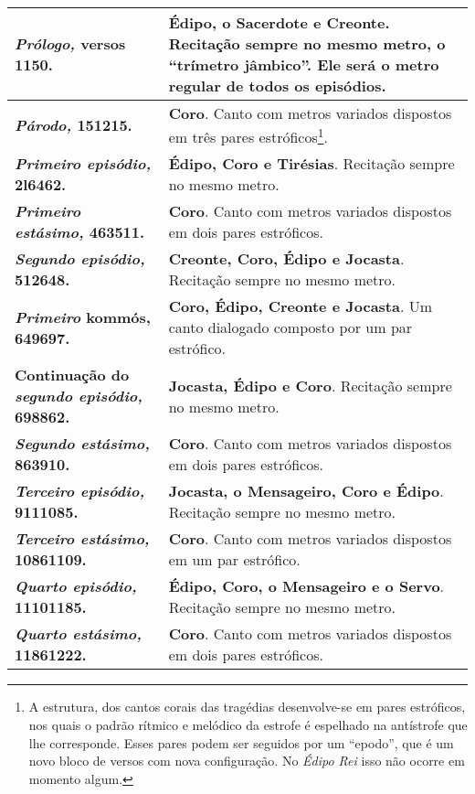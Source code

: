 \begin{tabular}[c]{|p{}|p{}|}
    \hline
    \textbf{\emph{Prólogo,} versos 1150.}                    & \textbf{Édipo, o Sacerdote e Creonte}. Recitação sempre no mesmo metro, o ``trímetro jâmbico''. Ele será o metro regular de todos os episódios. \\ \hline
    \textbf{\emph{Párodo,} 151215.}                          & \textbf{Coro}. Canto com metros variados dispostos em três pares estróficos\footnote{ A estrutura, dos cantos corais das tragédias desenvolve-se em pares estróficos, nos quais o padrão rítmico e melódico da estrofe é espelhado na antístrofe que lhe corresponde. Esses pares podem ser seguidos por um ``epodo'', que é um novo bloco de versos com nova configuração. No \emph{Édipo Rei} isso não ocorre em momento algum.}. \\ \hline
    \textbf{\emph{Primeiro episódio,} 2l6462.}               & \textbf{Édipo, Coro e Tirésias}. Recitação sempre no mesmo metro. \\ \hline
    \textbf{\emph{Primeiro estásimo,} 463511.}            & \textbf{Coro}. Canto com metros variados dispostos em dois pares estróficos. \\ \hline
    \textbf{\emph{Segundo episódio,} 512648.}                & \textbf{Creonte, Coro, Édipo e Jocasta}. Recitação sempre no mesmo metro.  \\ \hline
    \textbf{\emph{Primeiro} kommós, 649697.}       			& \textbf{Coro, Édipo, Creonte e Jocasta}. Um canto dialogado composto por um par estrófico. \\ \hline
    \textbf{Continuação do \emph{segundo episódio,} 698862.} & \textbf{Jocasta, Édipo e Coro}. Recitação sempre no mesmo metro. \\ \hline
    \textbf{\emph{Segundo estásimo,} 863910.}                & \textbf{Coro}. Canto com metros variados dispostos em dois pares estróficos. \\ \hline
    \textbf{\emph{Terceiro episódio,} 9111085.}              & \textbf{Jocasta, o Mensageiro, Coro e Édipo}. Recitação sempre no mesmo metro. \\ \hline
    \textbf{\emph{Terceiro estásimo,} 10861109.}             & \textbf{Coro}. Canto com metros variados dispostos em um par estrófico. \\ \hline
    \textbf{\emph{Quarto episódio,} 11101185.}               & \textbf{Édipo, Coro, o Mensageiro e o Servo}. Recitação sempre no mesmo metro. \\ \hline
    \textbf{\emph{Quarto estásimo,} 11861222.}               & \textbf{Coro}. Canto com metros variados dispostos em dois pares estróficos. \\ \hline

\end{tabular}
